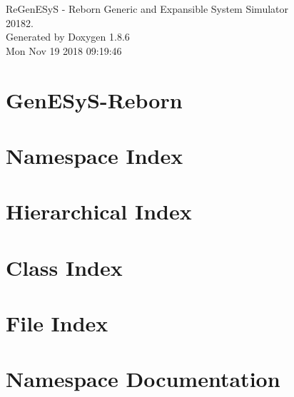 \documentclass[twoside]{book}
\newcommand{\clearemptydoublepage}{%
  \newpage{\pagestyle{empty}\cleardoublepage}%
}
\begin{document}
\hypersetup{pageanchor=false}
\begin{titlepage}
\vspace*{7cm}
\begin{center}%
{\Large Re\-Gen\-E\-Sy\-S -\/ Reborn Generic and Expansible System Simulator \\[1ex]\large 20182. }\\
\vspace*{1cm}
{\large Generated by Doxygen 1.8.6}\\
\vspace*{0.5cm}
{\small Mon Nov 19 2018 09:19:46}\\
\end{center}
\end{titlepage}
\clearemptydoublepage
\tableofcontents
\clearemptydoublepage
{}
\hypersetup{pageanchor=true}

\chapter{Gen\-E\-Sy\-S-\/\-Reborn}
\label{md__r_e_a_d_m_e}
\hypertarget{md__r_e_a_d_m_e}{}

\chapter{Namespace Index}

\chapter{Hierarchical Index}

\chapter{Class Index}

\chapter{File Index}

\chapter{Namespace Documentation}

\end{document}

